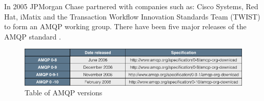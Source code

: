 \documentclass{thesis}
\begin{document}
In 2005 JPMorgan Chase partnered with companies such as: Cisco Systems, Red Hat, iMatix and the Transaction Workflow Innovation Standards Team (TWIST) to form an AMQP working group.  There have been five major releases of the AMQP standard \cite{AMQP_SPECS}.

\begin{figure}[h]
\centering
\includegraphics[scale=.5]{amqp_versions}  
\caption{Table of AMQP versions }
\end{figure}

\end{document}
